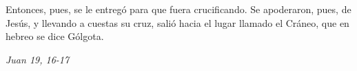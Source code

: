 \documentclass[../../devocionario.tex]{subfiles}
\begin{document}
    Entonces, pues, se le entregó para que fuera crucificando. Se apoderaron, pues, de Jesús, 
    y llevando a cuestas su cruz, salió hacia el lugar llamado el Cráneo, que en hebreo se dice Gólgota.     

    \begin{flushright}
        \emph{Juan 19, 16-17}
    \end{flushright}
\end{document}
